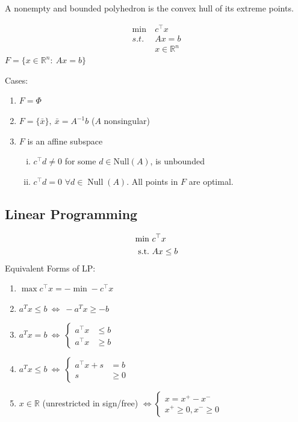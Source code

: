 \documentclass[11pt]{article}
\numberwithin{equation}{section}
\begin{document}
\begin{theorem}
    A nonempty and bounded polyhedron is the convex hull of its extreme points.
\end{theorem}

\begin{example}
    \begin{align*}
        \min \ &c^\top x\\
        s.t. \ & Ax=b \\
        & x \in \mathbb{R}^n
    \end{align*}
    $F=\{x \in \mathbb{R}^n:\ Ax=b\}$
    
    Cases:
    \begin{enumerate}[1)]
        \item $F= \Phi$
        \item $F=\{\bar{x}\}, \ \bar{x}=A^{-1}b$ ($A$ nonsingular)
        \item $F$ is an affine subspace
        \begin{enumerate}[i)]
            \item $c^\top d \neq 0$ for some $d \in \mathrm{Null}(A)$, is unbounded
            \item $c^\top d = 0$ $\forall d \in \operatorname{Null}(A)$. All points in $F$ are optimal.
        \end{enumerate}
    \end{enumerate}
\end{example}

\subsection{Linear Programming}
\begin{align*}
    \min \ & c^\top x \\
    \text{s.t.} \ & Ax\leq b
\end{align*}
Equivalent Forms of LP:
\begin{enumerate}[1.]
    \item $\max c^\top x = -\min - c^\top x$
    \item $a^{T} x \leq b \ \Longleftrightarrow\ -a^{T} x \geq -b$
    \item $a^{T} x=b  \ \Longleftrightarrow\ \left\{\begin{array}{ll}
        a^{\top} x & \leq b \\
        a^{\top} x & \geq b
        \end{array}\right.$
    \item $a^{T} x\leq b  \ \Longleftrightarrow\ \left\{\begin{array}{ll}
        a^{\top} x +s & = b \\
        s & \geq 0
        \end{array}\right.$
    \item $x \in \mathbb{R}$ (unrestricted in sign/free) $\Longleftrightarrow \left\{\begin{array}{l}
        x=x^{+}-x^{-} \\
        x^{+} \geqslant 0, x^{-} \geq 0
        \end{array}\right.$
\end{enumerate}
\end{document}
